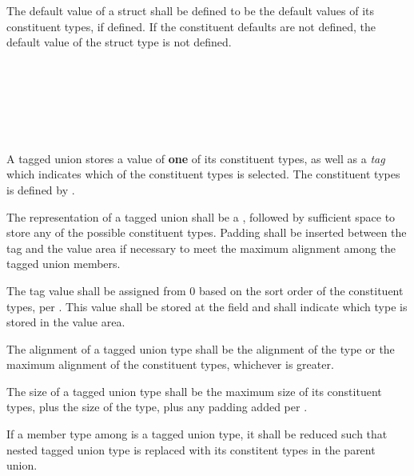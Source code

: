 \specsubsubitem
The default value of a struct shall be defined to be the default values of its
constituent types, if defined. If the constituent defaults are not defined, the
default value of the struct type is not defined.


\begin{grammar}
 \\
	\terminal{(}  \terminal{)} \\

 \\
	 \terminal{|}  \\
	 \terminal{|}  \\
\end{grammar}

\specsubsubitem
A tagged union stores a value of \textbf{one} of its constituent types, as well
as a \textit{tag} which indicates which of the constituent types is selected.
The constituent types is defined by .

\specsubsubitem
The representation of a tagged union shall be a , followed by
sufficient space to store any of the possible constituent types. Padding shall
be inserted between the tag and the value area if necessary to meet the maximum
alignment among the tagged union members.

\specsubsubitem
The tag value shall be assigned from $0$ based on the sort order of the
constituent types, per . This value shall be stored at the
 field and shall indicate which type is stored in the value area.


\specsubsubitem
The alignment of a tagged union type shall be the alignment of the
 type or the maximum alignment of the constituent types, whichever
is greater.

\specsubsubitem
The size of a tagged union type shall be the maximum size of its constituent
types, plus the size of the  type, plus any padding added per
.

\specsubsubitem
If a member type among  is a tagged union type, it
shall be reduced such that nested tagged union type is replaced with its
constitent types in the parent union.

